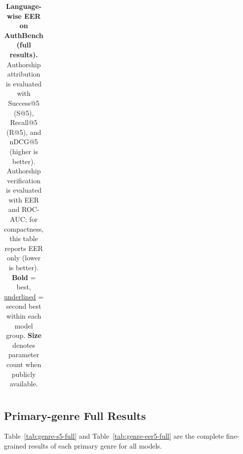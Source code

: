 \documentclass{article}
\newcommand{\rev}[1]{#1}
\begin{document}
\begin{table}[htbp]
{\begin{tabular}{lccccccccccc}
\bottomrule
\end{tabular}
}
\caption{\textbf{Language-wise EER on AuthBench (full results).} Authorship attribution is evaluated with Success@5 (S@5), Recall@5 (R@5), and nDCG@5 (higher is better). \rev{Authorship verification is evaluated with EER and ROC-AUC; for compactness, this table reports EER only (lower is better).} \textbf{Bold} = best, \underline{underlined} = second best within each model group. \textbf{Size} denotes parameter count when publicly available.}
\label{tab:lang-eer5-full}
\end{table}

\subsection{Primary-genre Full Results}
Table~\ref{tab:genre-s5-full} and Table~\ref{tab:genre-eer5-full} are the complete fine-grained results of each primary genre for all models.
\end{document}
